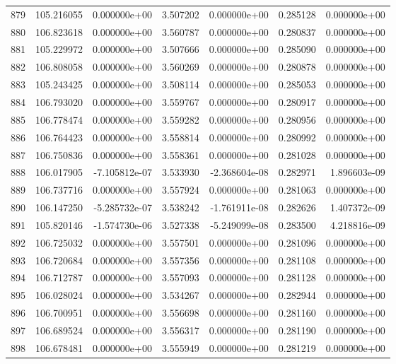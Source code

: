 \begin{tabular}{rrrrrrr}
 879 & 105.216055 &  0.000000e+00 &  3.507202 &  0.000000e+00 &   0.285128 &  0.000000e+00 \\
 880 & 106.823618 &  0.000000e+00 &  3.560787 &  0.000000e+00 &   0.280837 &  0.000000e+00 \\
 881 & 105.229972 &  0.000000e+00 &  3.507666 &  0.000000e+00 &   0.285090 &  0.000000e+00 \\
 882 & 106.808058 &  0.000000e+00 &  3.560269 &  0.000000e+00 &   0.280878 &  0.000000e+00 \\
 883 & 105.243425 &  0.000000e+00 &  3.508114 &  0.000000e+00 &   0.285053 &  0.000000e+00 \\
 884 & 106.793020 &  0.000000e+00 &  3.559767 &  0.000000e+00 &   0.280917 &  0.000000e+00 \\
 885 & 106.778474 &  0.000000e+00 &  3.559282 &  0.000000e+00 &   0.280956 &  0.000000e+00 \\
 886 & 106.764423 &  0.000000e+00 &  3.558814 &  0.000000e+00 &   0.280992 &  0.000000e+00 \\
 887 & 106.750836 &  0.000000e+00 &  3.558361 &  0.000000e+00 &   0.281028 &  0.000000e+00 \\
 888 & 106.017905 & -7.105812e-07 &  3.533930 & -2.368604e-08 &   0.282971 &  1.896603e-09 \\
 889 & 106.737716 &  0.000000e+00 &  3.557924 &  0.000000e+00 &   0.281063 &  0.000000e+00 \\
 890 & 106.147250 & -5.285732e-07 &  3.538242 & -1.761911e-08 &   0.282626 &  1.407372e-09 \\
 891 & 105.820146 & -1.574730e-06 &  3.527338 & -5.249099e-08 &   0.283500 &  4.218816e-09 \\
 892 & 106.725032 &  0.000000e+00 &  3.557501 &  0.000000e+00 &   0.281096 &  0.000000e+00 \\
 893 & 106.720684 &  0.000000e+00 &  3.557356 &  0.000000e+00 &   0.281108 &  0.000000e+00 \\
 894 & 106.712787 &  0.000000e+00 &  3.557093 &  0.000000e+00 &   0.281128 &  0.000000e+00 \\
 895 & 106.028024 &  0.000000e+00 &  3.534267 &  0.000000e+00 &   0.282944 &  0.000000e+00 \\
 896 & 106.700951 &  0.000000e+00 &  3.556698 &  0.000000e+00 &   0.281160 &  0.000000e+00 \\
 897 & 106.689524 &  0.000000e+00 &  3.556317 &  0.000000e+00 &   0.281190 &  0.000000e+00 \\
 898 & 106.678481 &  0.000000e+00 &  3.555949 &  0.000000e+00 &   0.281219 &  0.000000e+00 \\

\end{tabular}
